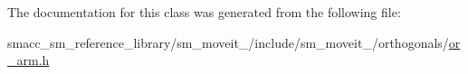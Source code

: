 The documentation for this class was generated from the following file\+:\begin{DoxyCompactItemize}
\item 
smacc\+\_\+sm\+\_\+reference\+\_\+library/sm\+\_\+moveit\+\_/include/sm\+\_\+moveit\+\_/orthogonals/\hyperlink{4_2include_2sm__moveit__4_2orthogonals_2or__arm_8h}{or\+\_\+arm.\+h}\end{DoxyCompactItemize}
